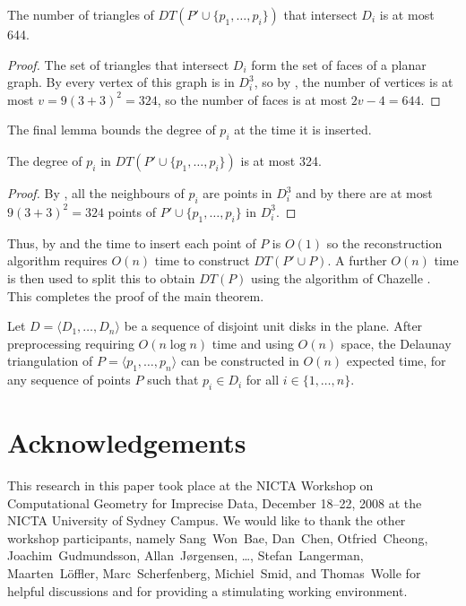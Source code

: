 \documentclass[lotsofwhite]{patmorin}
\begin{document}
\begin{lem}
The number of triangles of $DT(P'\cup\{p_1,\ldots,p_i\})$ that
intersect $D_i$ is at most 644.
\end{lem}

\begin{proof}
The set of triangles that intersect $D_i$ form the set of faces of a
planar graph.  By  every vertex of this graph is in
$D_i^3$, so by , the number of vertices 
is at most $v=9(3+3)^2=324$, so the number of faces is at most
$2v-4=644$. 
\end{proof}

The final lemma bounds the degree of $p_i$ at the time it is inserted.

\begin{lem}
The degree of $p_i$ in $DT(P'\cup\{p_1,\ldots,p_i\})$ is at most 324.
\end{lem}

\begin{proof}
By , all the neighbours of $p_i$ are points in $D_i^3$
and by  there are at most $9(3+3)^2=324$ points
of $P'\cup\{p_1,\ldots,p_i\}$ in $D_i^3$.
\end{proof}

Thus, by  and  the time to insert
each point of $P$ is $O(1)$ so the reconstruction algorithm requires
$O(n)$ time to construct $DT(P'\cup P)$.  A further $O(n)$ time is
then used to split this to obtain $DT(P)$ using the algorithm of
Chazelle \etal.  This completes the proof of the main theorem.

\begin{thm}
Let $D=\langle D_1,\ldots,D_n\rangle$ be a sequence of disjoint unit
disks in the plane.  After preprocessing requiring $O(n\log n)$ time
and using $O(n)$ space, the Delaunay triangulation of $P=\langle
p_1,\ldots,p_n\rangle$ can be constructed in $O(n)$ expected time, for any
sequence of points $P$ such that $p_i\in D_i$ for all
$i\in\{1,\ldots,n\}$.
\end{thm}

\section*{Acknowledgements}

This research in this paper took place at the NICTA Workshop on
Computational Geometry for Imprecise Data, December 18--22, 2008 at
the NICTA University of Sydney Campus.  We would like to thank the
other workshop participants, namely
Sang~Won~Bae,
Dan~Chen,
Otfried~Cheong,
Joachim~Gudmundsson,
Allan~J\o rgensen,
\ldots,
Stefan~Langerman,
Maarten~L\"offler,
Marc~Scherfenberg,
Michiel~Smid,
and
Thomas~Wolle
for helpful discussions and for providing a stimulating working
environment.



\end{document}
